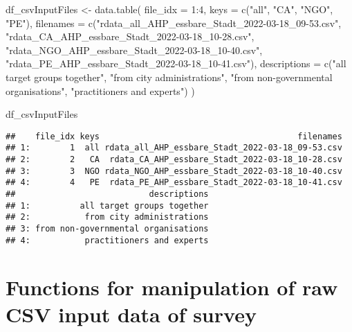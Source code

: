\documentclass[
]{article}
\newenvironment{Shaded}{\begin{snugshade}}{\end{snugshade}}
\newcommand{\AttributeTok}[1]{\textcolor[rgb]{0.00,0.34,0.68}{#1}}
\newcommand{\DecValTok}[1]{\textcolor[rgb]{0.69,0.50,0.00}{#1}}
\newcommand{\FunctionTok}[1]{\textcolor[rgb]{0.39,0.29,0.61}{#1}}
\newcommand{\NormalTok}[1]{\textcolor[rgb]{0.12,0.11,0.11}{#1}}
\newcommand{\OtherTok}[1]{\textcolor[rgb]{0.00,0.43,0.16}{#1}}
\newcommand{\SpecialCharTok}[1]{\textcolor[rgb]{0.24,0.68,0.91}{#1}}
\newcommand{\StringTok}[1]{\textcolor[rgb]{0.75,0.01,0.01}{#1}}
\begin{document}
\begin{Shaded}
\begin{Highlighting}[]
\NormalTok{df\_csvInputFiles }\OtherTok{\textless{}{-}} \FunctionTok{data.table}\NormalTok{(}
  \AttributeTok{file\_idx =} \DecValTok{1}\SpecialCharTok{:}\DecValTok{4}\NormalTok{,}
  \AttributeTok{keys =} \FunctionTok{c}\NormalTok{(}\StringTok{"all"}\NormalTok{, }\StringTok{"CA"}\NormalTok{, }\StringTok{"NGO"}\NormalTok{, }\StringTok{"PE"}\NormalTok{),}
  \AttributeTok{filenames =} \FunctionTok{c}\NormalTok{(}\StringTok{"rdata\_all\_AHP\_essbare\_Stadt\_2022{-}03{-}18\_09{-}53.csv"}\NormalTok{,}
                \StringTok{"rdata\_CA\_AHP\_essbare\_Stadt\_2022{-}03{-}18\_10{-}28.csv"}\NormalTok{,}
                \StringTok{"rdata\_NGO\_AHP\_essbare\_Stadt\_2022{-}03{-}18\_10{-}40.csv"}\NormalTok{,}
                \StringTok{"rdata\_PE\_AHP\_essbare\_Stadt\_2022{-}03{-}18\_10{-}41.csv"}\NormalTok{),}
  \AttributeTok{descriptions =} \FunctionTok{c}\NormalTok{(}\StringTok{"all target groups together"}\NormalTok{,}
                   \StringTok{"from city administrations"}\NormalTok{,}
                   \StringTok{"from non{-}governmental organisations"}\NormalTok{,}
                   \StringTok{"practitioners and experts"}\NormalTok{)}
\NormalTok{)}

\NormalTok{df\_csvInputFiles}
\end{Highlighting}
\end{Shaded}

\begin{verbatim}
##    file_idx keys                                        filenames
## 1:        1  all rdata_all_AHP_essbare_Stadt_2022-03-18_09-53.csv
## 2:        2   CA  rdata_CA_AHP_essbare_Stadt_2022-03-18_10-28.csv
## 3:        3  NGO rdata_NGO_AHP_essbare_Stadt_2022-03-18_10-40.csv
## 4:        4   PE  rdata_PE_AHP_essbare_Stadt_2022-03-18_10-41.csv
##                           descriptions
## 1:          all target groups together
## 2:           from city administrations
## 3: from non-governmental organisations
## 4:           practitioners and experts
\end{verbatim}

\hypertarget{functions-for-manipulation-of-raw-csv-input-data-of-survey}{%
\section{Functions for manipulation of raw CSV input data of
survey}\label{functions-for-manipulation-of-raw-csv-input-data-of-survey}}
\end{document}

